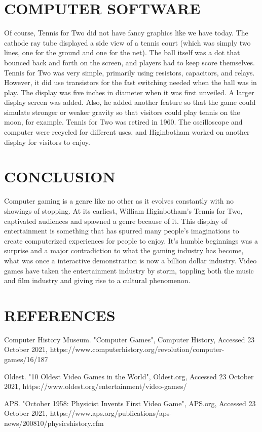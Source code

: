 \documentclass[letterpaper, 10 pt, conference]{IEEEconf}
\begin{document}
\section{COMPUTER SOFTWARE}
Of course, Tennis for Two did not have fancy graphics like we have today. The cathode ray tube displayed a side view of a tennis court (which was simply two lines, one for the ground and one for the net). The ball itself was a dot that bounced back and forth on the screen, and players had to keep score themselves. Tennis for Two was very simple, primarily using resistors, capacitors, and relays. However, it did use transistors for the fast switching needed when the ball was in play. The display was five inches in diameter when it was first unveiled. A larger display screen was added. Also, he added another feature so that the game could simulate stronger or weaker gravity so that visitors could play tennis on the moon, for example. Tennis for Two was retired in 1960. The oscilloscope and computer were recycled for different uses, and Higinbotham worked on another display for visitors to enjoy.

\section{CONCLUSION}

Computer gaming is a genre like no other as it evolves constantly with no showings of stopping. At its earliest, William Higinbotham’s Tennis for Two, captivated audiences and spawned a genre because of it. This display of entertainment is something that has spurred many people's imaginations to create computerized experiences for people to enjoy. It's humble beginnings was a surprise and a major contradiction to what the gaming industry has become, what was once a interactive demonstration is now a billion dollar industry. Video games have taken the entertainment industry by storm, toppling both the music and film industry and giving rise to a cultural phenomenon. 

\section*{REFERENCES}

\begin{enumerate}[label={[\arabic*]}]
\item Computer History Museum. "Computer Games", Computer History, Accessed 23 October 2021,
https://www.computerhistory.org/revolution/computer-games/16/187
\item Oldest. "10 Oldest Video Games in the World", Oldest.org, Accessed 23 October 2021,
https://www.oldest.org/entertainment/video-games/
\item APS. "October 1958: Physicist Invents First Video Game", APS.org, Accessed 23 October 2021,
https://www.aps.org/publications/aps-news/200810/physicshistory.cfm
\item 

\end{enumerate}
\end{document}
